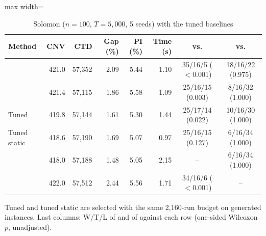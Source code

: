\begin{table}[t]
\centering
\caption{Solomon ($n=100$, $T=5{,}000$, 5 seeds) with the tuned baselines}\label{tab:main2}
\setlength{\tabcolsep}{3pt}
\begin{adjustbox}{max width=\linewidth}
\begin{tabular}{lrrrrrcc}
\toprule
Method & CNV & CTD & Gap (\%) & PI (\%) & Time (s) & \sgalns{} vs. & \sgc{} vs.\\ \midrule
\Uni{} & 421.0 & 57,352 & 2.09 & 5.44 & 1.10 & 35/16/5 ($<$0.001) & 18/16/22 (0.975)\\
\Rw{} & 421.4 & 57,115 & 1.86 & 5.58 & 1.09 & 25/16/15 (0.003) & 8/16/32 (1.000)\\
Tuned \Rw{} & 419.8 & 57,144 & 1.61 & 5.30 & 1.44 & 25/17/14 (0.022) & 10/16/30 (1.000)\\
Tuned static & 418.6 & 57,190 & 1.69 & 5.07 & 0.97 & 25/16/15 (0.127) & 6/16/34 (1.000)\\
\sgalns{} & 418.0 & 57,188 & 1.48 & 5.05 & 2.15 & -- & 6/16/34 (1.000)\\
\sgc{} & 422.0 & 57,512 & 2.44 & 5.56 & 1.71 & 34/16/6 ($<$0.001) & --\\
\bottomrule
\end{tabular}
\end{adjustbox}
\par\vspace{2pt}\parbox{\linewidth}{\footnotesize Tuned \Rw{} and tuned static are selected with the same 2{,}160-run budget on generated instances. Last columns: W/T/L of \sgalns{} and of \sgc{} against each row (one-sided Wilcoxon $p$, unadjusted).}
\end{table}
